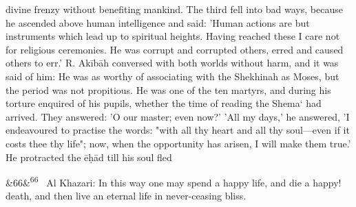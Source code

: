 \documentclass[12pt]{article}
\newcommand{\para}[1][]{\par\noindent\ifx&#1&\else\textsuperscript{\footnotesize #1}~\fi}
\begin{document}
divine frenzy without benefiting mankind. The third fell into bad ways, because he ascended above human intelligence and said: 'Human actions are but instruments which lead up to spiritual heights. Having reached these I care not for religious ceremonies. He was corrupt and corrupted others, erred and caused others to err.' R. Akībāh conversed with both worlds without harm, and it was said of him: He was as worthy of associating with the Shekhinah as Moses, but the period was not propitious. He was one of the ten martyrs, and during his torture enquired of his pupils, whether the time of reading the Shema‘ had arrived. They answered: 'O our master; even now?' 'All my days,' he answered, 'I endeavoured to practise the words: "with all thy heart and all thy soul---even if it costs thee thy life"; now, when the opportunity has arisen, I will make them true.' He protracted the ēḥād till his soul fled

\para[66] Al Khazari: In this way one may spend a happy life, and die a happy! death, and then live an eternal life in never-ceasing bliss.
\end{document}
